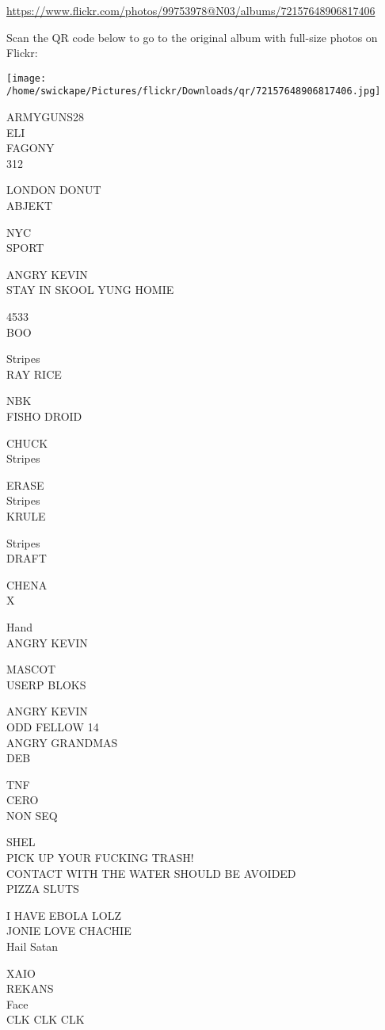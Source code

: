 \documentclass[10pt,letterpaper]{article}
\begin{document}
\url{https://www.flickr.com/photos/99753978@N03/albums/72157648906817406}

Scan the QR code below to go to the original album with full-size photos on Flickr:

\texttt{[image: /home/swickape/Pictures/flickr/Downloads/qr/72157648906817406.jpg]}


ARMYGUNS28\\
ELI\\
FAGONY\\
312

LONDON DONUT\\
ABJEKT

NYC\\
SPORT

ANGRY KEVIN\\
STAY IN SKOOL YUNG HOMIE

4533\\
BOO

Stripes\\
RAY RICE

NBK\\
FISHO DROID

CHUCK\\
Stripes

ERASE\\
Stripes\\
KRULE

Stripes\\
DRAFT

CHENA\\
X

Hand\\
ANGRY KEVIN

MASCOT\\
USERP BLOKS

ANGRY KEVIN\\
ODD FELLOW 14\\
ANGRY GRANDMAS\\
DEB

TNF\\
CERO\\
NON SEQ

SHEL\\
PICK UP YOUR FUCKING TRASH!\\
CONTACT WITH THE WATER SHOULD BE AVOIDED\\
PIZZA SLUTS

I HAVE EBOLA LOLZ\\
JONIE LOVE CHACHIE\\
Hail Satan

XAIO\\
REKANS\\
Face\\
CLK CLK CLK
\end{document}
